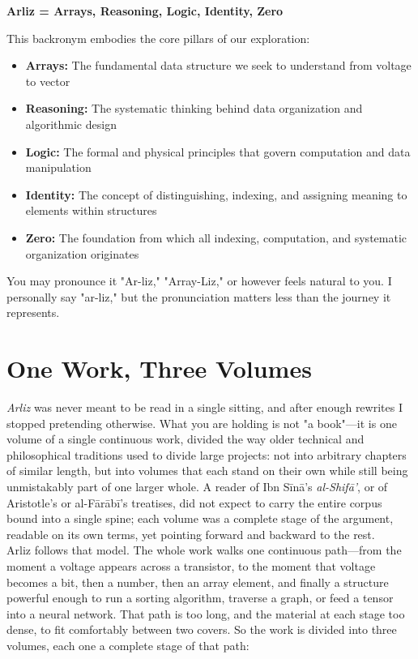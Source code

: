 \begin{center}
	\textbf{Arliz = Arrays, Reasoning, Logic, Identity, Zero}
\end{center}

This backronym embodies the core pillars of our exploration:
\begin{itemize}
	\item \textbf{Arrays:} The fundamental data structure we seek to understand from voltage to vector
	\item \textbf{Reasoning:} The systematic thinking behind data organization and algorithmic design
	\item \textbf{Logic:} The formal and physical principles that govern computation and data manipulation
	\item \textbf{Identity:} The concept of distinguishing, indexing, and assigning meaning to elements within structures
	\item \textbf{Zero:} The foundation from which all indexing, computation, and systematic organization originates
\end{itemize}

You may pronounce it "Ar-liz," "Array-Liz," or however feels natural to you. I personally say "ar-liz," but the pronunciation matters less than the journey it represents.

\section*{One Work, Three Volumes}

\textit{Arliz} was never meant to be read in a single sitting, and after enough rewrites I stopped pretending otherwise. What you are holding is not "a book"---it is one volume of a single continuous work, divided the way older technical and philosophical traditions used to divide large projects: not into arbitrary chapters of similar length, but into volumes that each stand on their own while still being unmistakably part of one larger whole. A reader of Ibn S\=in\=a's \textit{al-Shif\=a'}, or of Aristotle's or al-F\=ar\=ab\=i's treatises, did not expect to carry the entire corpus bound into a single spine; each volume was a complete stage of the argument, readable on its own terms, yet pointing forward and backward to the rest.\\
Arliz follows that model. The whole work walks one continuous path---from the moment a voltage appears across a transistor, to the moment that voltage becomes a bit, then a number, then an array element, and finally a structure powerful enough to run a sorting algorithm, traverse a graph, or feed a tensor into a neural network. That path is too long, and the material at each stage too dense, to fit comfortably between two covers. So the work is divided into three volumes, each one a complete stage of that path:

